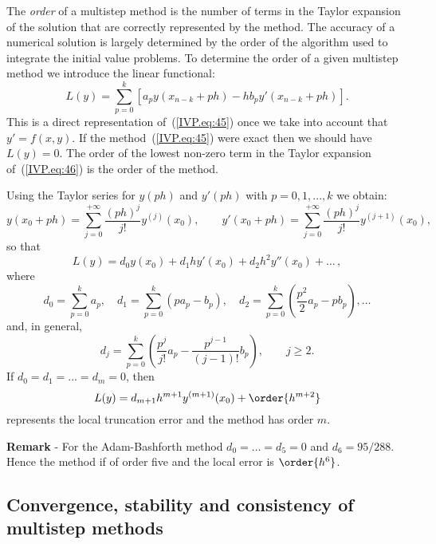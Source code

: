 The \textit{order} of a multistep method is the number of terms in the
Taylor expansion of the solution that are correctly represented by the
method.  The accuracy of a numerical solution is largely determined by
the order of the algorithm used to integrate the initial value
problems.  To determine the order of a given multistep method we
introduce the linear functional:
%
\begin{equation}
  L(y) = \sum_{p=0}^k [a_p y(x_{n-k}+ p h) - h b_p y'(x_{n-k}+p h)].
  \label{IVP.eq:46}
\end{equation}
%
This is a direct representation of~(\ref{IVP.eq:45}) once we take into
account that $y'=f(x,y)$.  If the method~(\ref{IVP.eq:45}) were exact
then we should have $L(y)=0$.  The order of the lowest non-zero term
in the Taylor expansion of~(\ref{IVP.eq:46}) is the order of the
method.

\noindent
Using the Taylor series for $y(p h)$ and $y'(p h)$ with $p=0,1,...,k$
we obtain:
% 
\begin{equation}
  y(x_0+p h) = \sum_{j=0}^{+\infty} \frac{(p h)^j}{j!} y^{(j)} (x_0),
  \qquad
  y'(x_0+p h) = \sum_{j=0}^{+\infty} \frac{(p h)^j}{j!} y^{(j+1)}(x_0),
\end{equation}
%
so that
%
\begin{equation}
  L(y) = d_0 y(x_0) + d_1 h y'(x_0) + d_2 h^2 y''(x_0) + \ldots \, ,
\end{equation}
%
where
%
\begin{equation}
  d_0 = \sum_{p=0}^k a_p, \quad 
  d_1 = \sum_{p=0}^k (p a_p-b_p), \quad
  d_2 = \sum_{p=0}^k \left ( \frac{p^2}{2} a_p - p b_p \right ), \ldots
\end{equation}
%
and, in general,
%
\begin{equation}
  d_j = \sum_{p=0}^k \left( \frac{p^j}{j!} a_p -
    \frac{p^{j-1}}{(j-1)!} b_p \right) , 
  \qquad j \ge 2 .
\end{equation}
% 
If $d_0=d_1=...=d_m=0$, then 
%
\begin{equation}
  L(y) = d_{m+1} h^{m+1} y^{(m+1)}(x_0) + \order{h^{m+2}}
\end{equation}
%
represents the local truncation error and the method has order $m$.

\smallskip

\noindent \textbf{Remark} - For the Adam-Bashforth method
$d_0=\ldots=d_5 = 0$ and $d_6=95/288$.  Hence the method if of order
five and the local error is $\order{h^6}$.

\subsection[Convergence, stability and consistency]{Convergence, stability and consistency of multistep methods}

